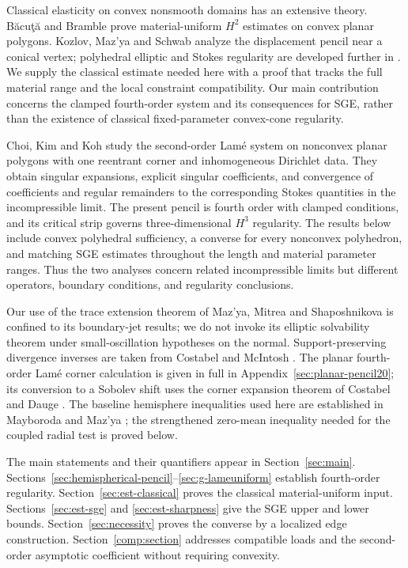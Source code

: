 \documentclass[11pt,a4paper]{article}
\theoremstyle{remark}
\numberwithin{equation}{section}
\begin{document}
Classical elasticity on convex nonsmooth domains has an extensive
theory. B\u{a}cu\c{t}\u{a} and Bramble \cite{BacutaBramble2003} prove
material-uniform \(H^2\) estimates on convex planar polygons.
Kozlov, Maz'ya and Schwab \cite{KozlovMazyaSchwab1992} analyze the
displacement pencil near a conical vertex; polyhedral elliptic and Stokes
regularity are developed further in \cite{MazyaRossmann2004,MazyaRossmann2007}.
We supply the classical estimate needed here with a proof that tracks
the full material range and the local constraint compatibility.
Our main contribution concerns the clamped fourth-order system and its
consequences for SGE, rather than the existence of classical fixed-parameter
convex-cone regularity.

Choi, Kim and Koh \cite{ChoiKimKoh2025} study the second-order Lam\'e
system on nonconvex planar polygons with one reentrant corner and
inhomogeneous Dirichlet data.
They obtain singular expansions, explicit singular coefficients, and
convergence of coefficients and regular remainders to the corresponding
Stokes quantities in the incompressible limit. The present pencil is
fourth order with clamped conditions, and its critical strip governs
three-dimensional \(H^3\) regularity. The results below include convex
polyhedral sufficiency, a converse for every nonconvex polyhedron,
and matching SGE estimates throughout the length and material parameter
ranges. Thus the two analyses concern related incompressible limits
but different operators, boundary conditions, and regularity conclusions.

Our use of the trace extension theorem of Maz'ya, Mitrea and
Shaposhnikova \cite{MMS2010} is confined to its boundary-jet results;
we do not invoke its elliptic solvability theorem under small-oscillation
hypotheses on the normal. Support-preserving divergence inverses are
taken from Costabel and McIntosh \cite{CostabelMcIntosh2010}.
The planar fourth-order Lam\'e corner calculation is given in full in
Appendix~\ref{sec:planar-pencil20}; its conversion to a Sobolev shift uses
the corner expansion theorem of Costabel and Dauge \cite{CostabelDauge1994}.
The baseline hemisphere inequalities used here are established in
Mayboroda and Maz'ya \cite[Lemma~2.3, (2.16), (2.25)]{MayborodaMazya2008};
the strengthened zero-mean inequality needed for the coupled radial
test is proved below.

The main statements and their quantifiers appear in Section~\ref{sec:main}.
Sections~\ref{sec:hemispherical-pencil}--\ref{sec:g-lameuniform}
establish fourth-order regularity. Section~\ref{sec:est-classical}
proves the classical material-uniform input.
Sections~\ref{sec:est-sge} and \ref{sec:est-sharpness}
give the SGE upper and lower bounds.
Section~\ref{sec:necessity} proves the converse by a localized edge
construction. Section~\ref{comp:section} addresses compatible loads and the
second-order asymptotic coefficient without requiring convexity.
\end{document}

